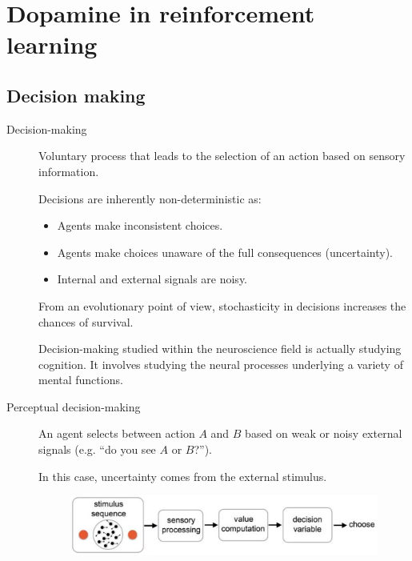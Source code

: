 \chapter{Dopamine in reinforcement learning}


\section{Decision making}

\begin{description}
    \item[Decision-making] 
        Voluntary process that leads to the selection of an action based on sensory information.

        Decisions are inherently non-deterministic as:
        \begin{itemize}
            \item Agents make inconsistent choices.
            \item Agents make choices unaware of the full consequences (uncertainty).
            \item Internal and external signals are noisy.
        \end{itemize}

        \begin{remark}
            From an evolutionary point of view, stochasticity in decisions increases the chances of survival.
        \end{remark}

        \begin{remark}
            Decision-making studied within the neuroscience field is actually studying cognition.
            It involves studying the neural processes underlying a variety of mental functions.
        \end{remark}
    

    \item[Perceptual decision-making] 
        An agent selects between action $A$ and $B$ based on weak or noisy external signals (e.g. ``do you see $A$ or $B$?'').

        In this case, uncertainty comes from the external stimulus.

        \begin{figure}[H]
            \centering
            \includegraphics[width=0.55\linewidth]{./img/perceptual_dm.png}
        \end{figure}


\end{description}
